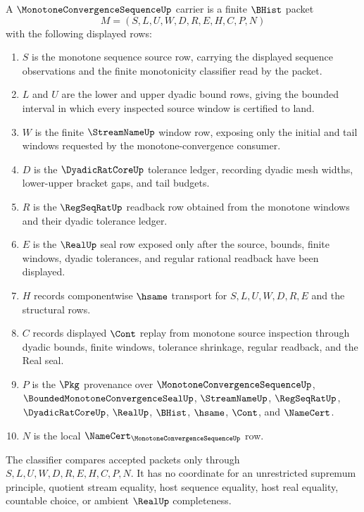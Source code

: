 \begin{definition}
\label{def:monotone-convergence-sequence-carrier}
A $\MonotoneConvergenceSequenceUp$ carrier is a finite $\BHist$ packet
$$
M=(S,L,U,W,D,R,E,H,C,P,N)
$$
with the following displayed rows:
\begin{enumerate}
\item $S$ is the monotone sequence source row, carrying the displayed sequence observations and the finite monotonicity classifier read by the packet.
\item $L$ and $U$ are the lower and upper dyadic bound rows, giving the bounded interval in which every inspected source window is certified to land.
\item $W$ is the finite $\StreamNameUp$ window row, exposing only the initial and tail windows requested by the monotone-convergence consumer.
\item $D$ is the $\DyadicRatCoreUp$ tolerance ledger, recording dyadic mesh widths, lower-upper bracket gaps, and tail budgets.
\item $R$ is the $\RegSeqRatUp$ readback row obtained from the monotone windows and their dyadic tolerance ledger.
\item $E$ is the $\RealUp$ seal row exposed only after the source, bounds, finite windows, dyadic tolerances, and regular rational readback have been displayed.
\item $H$ records componentwise $\hsame$ transport for $S,L,U,W,D,R,E$ and the structural rows.
\item $C$ records displayed $\Cont$ replay from monotone source inspection through dyadic bounds, finite windows, tolerance shrinkage, regular readback, and the Real seal.
\item $P$ is the $\Pkg$ provenance over $\MonotoneConvergenceSequenceUp$, $\BoundedMonotoneConvergenceSealUp$, $\StreamNameUp$, $\RegSeqRatUp$, $\DyadicRatCoreUp$, $\RealUp$, $\BHist$, $\hsame$, $\Cont$, and $\NameCert$.
\item $N$ is the local $\NameCert_{\MonotoneConvergenceSequenceUp}$ row.
\end{enumerate}
The classifier compares accepted packets only through $S,L,U,W,D,R,E,H,C,P,N$. It has no coordinate for an unrestricted supremum principle, quotient stream equality, host sequence equality, host real equality, countable choice, or ambient $\RealUp$ completeness.
\end{definition}

